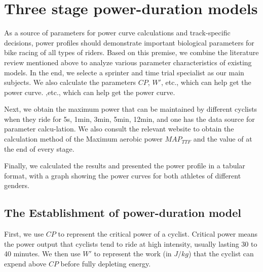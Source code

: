 \documentclass{mcmthesis}
\begin{document}
\section{Three stage power-duration models}
As a source of parameters for power curve calculations and track-specific decisions, power profiles
should demonstrate important biological parameters for bike racing of all types of riders. Based
on this premise, we combine the literature review mentioned above to analyze various parameter
characteristics of existing models. In the end, we selecte a sprinter and time trial specialist as our
main subjects. We also calculate the parameters $CP$, $W'$, etc., which can help get the power curve.
,etc., which can help get the power curve.

Next, we obtain the maximum power that can be maintained by different cyclists when they
ride for 5s, 1min, 3min, 5min, 12min, and one has the data source for parameter calcu-lation. We
also consult the relevant website to obtain the calculation method of the Maximum aerobic power
$MAP_{T T F}$ and the value of at the end of every stage.

Finally, we calculated the results and presented the power profile in a tabular format, with a graph
showing the power curves for both athletes of different genders.
\subsection{The Establishment of power-duration model}
First, we use $CP$ to represent the critical power of a cyclist. Critical power means the power
output that cyclists tend to ride at high intensity, usually lasting 30 to 40 minutes. We then use $W'$
to represent the work (in $J/kg$) that the cyclist can expend above $CP$ before fully depleting energy.
\end{document}
